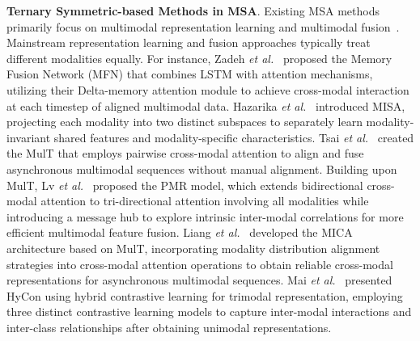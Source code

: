\documentclass[letterpaper]{article} %
\begin{document}
\noindent \textbf{Ternary Symmetric-based Methods in MSA}.
Existing MSA methods primarily focus on multimodal representation learning and multimodal fusion~\cite{zadeh2018memory,hazarika2020misa,tsai2019multimodal,yang2022contextual,yang2022disentangled,yang2022learning,yang2023target}. Mainstream representation learning and fusion approaches typically treat different modalities equally. For instance, Zadeh \textit{et al.}~\cite{zadeh2018memory} proposed the Memory Fusion Network (MFN) that combines LSTM with attention mechanisms, utilizing their Delta-memory attention module to achieve cross-modal interaction at each timestep of aligned multimodal data. Hazarika \textit{et al.}~\cite{hazarika2020misa} introduced MISA, projecting each modality into two distinct subspaces to separately learn modality-invariant shared features and modality-specific characteristics. Tsai \textit{et al.}~\cite{tsai2019multimodal} created the MulT that employs pairwise cross-modal attention to align and fuse asynchronous multimodal sequences without manual alignment. Building upon MulT, Lv \textit{et al.}~\cite{lv2021progressive} proposed the PMR model, which extends bidirectional cross-modal attention to tri-directional attention involving all modalities while introducing a message hub to explore intrinsic inter-modal correlations for more efficient multimodal feature fusion. Liang \textit{et al.}~\cite{liang2021attention} developed the MICA architecture based on MulT, incorporating modality distribution alignment strategies into cross-modal attention operations to obtain reliable cross-modal representations for asynchronous multimodal sequences. Mai \textit{et al.}~\cite{mai2022hybrid} presented HyCon using hybrid contrastive learning for trimodal representation, employing three distinct contrastive learning models to capture inter-modal interactions and inter-class relationships after obtaining unimodal representations. 

\end{document}
